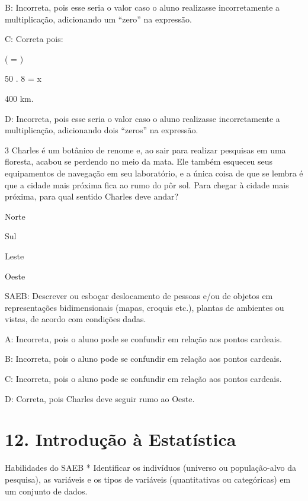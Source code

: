 {B: Incorreta, pois esse seria o valor caso o aluno realizasse
incorretamente a multiplicação, adicionando um ``zero'' na expressão.

C: Correta pois:

( = )

50 . 8 = x

400 km.

D: Incorreta, pois esse seria o valor caso o aluno realizasse
incorretamente a multiplicação, adicionando dois ``zeros'' na expressão.

\num{3} Charles é um botânico de renome e, ao sair para realizar pesquisas em
uma floresta, acabou se perdendo no meio da mata. Ele também esqueceu
seus equipamentos de navegação em seu laboratório, e a única coisa de
que se lembra é que a cidade mais próxima fica ao rumo do pôr sol. Para
chegar à cidade mais próxima, para qual sentido Charles deve andar?
\item Norte
\item Sul
\item Leste
\item Oeste

SAEB: Descrever ou esboçar deslocamento de pessoas e/ou de objetos em
representações bidimensionais (mapas, croquis etc.), plantas de
ambientes ou vistas, de acordo com condições dadas.

A: Incorreta, pois o aluno pode se confundir em relação aos pontos
cardeais.

B: Incorreta, pois o aluno pode se confundir em relação aos pontos
cardeais.

C: Incorreta, pois o aluno pode se confundir em relação aos pontos
cardeais.

D: Correta, pois Charles deve seguir rumo ao Oeste.


\section{12. Introdução à
Estatística}

Habilidades do SAEB * Identificar os indivíduos (universo ou
população-alvo da pesquisa), as variáveis e os tipos de variáveis
(quantitativas ou categóricas) em um conjunto de dados.

}
